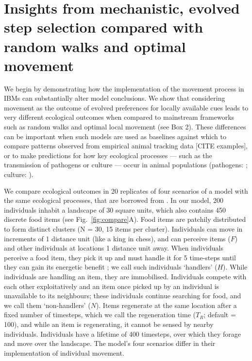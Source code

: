 \section{Insights from mechanistic, evolved step selection compared with random walks and optimal movement}

We begin by demonstrating how the implementation of the movement process in IBMs can substantially alter model conclusions.
We show that considering movement as the outcome of evolved preferences for locally available cues leads to very different ecological outcomes when compared to mainstream frameworks such as random walks and optimal local movement (see Box 2).
These differences can be important when such models are used as baselines against which to compare patterns observed from empirical animal tracking data [CITE examples], or to make predictions for how key ecological processes --- such as the transmission of pathogens or culture --- occur in animal populations (pathogens: \cite{white2018,white2018b,cantor2021,scherer2020}; culture: \cite{romano2020,romano2021,cantor2021,cantor2021a}).

We compare ecological outcomes in 20 replicates of four scenarios of a model with the same ecological processes, that are borrowed from \citet{gupte2022c}.
In our model, 200 individuals inhabit a landscape of 30 square units, which also contains 450 discrete food items (see Fig.~\ref{fig:compare}A).
Food items are patchily distributed to form distinct clusters (N = 30, 15 items per cluster).
Individuals can move in increments of 1 distance unit (like a king in chess), and can perceive items ($F$) and other individuals at locations 1 distance unit away.
When individuals perceive a food item, they pick it up and must handle it for 5 time-steps until they can gain its energetic benefit \citep{ruxton1992,gupte2021a,gupte2022c}; we call such individuals `handlers' ($H$).
While individuals are handling an item, they are immobilised.
Individuals compete with each other exploitatively and an item once picked up by an individual is unavailable to its neighbours; these individuals continue searching for food, and we call them `non-handlers' ($N$).
Items regenerate at the same location after a fixed number of timesteps, which we call the regeneration time ($T_R$; default = 100), and while an item is regenerating, it cannot be sensed by nearby individuals.
Individuals have a lifetime of 400 timesteps, over which they forage and move over the landscape.
The model's four scenarios differ in their implementation of individual movement.

